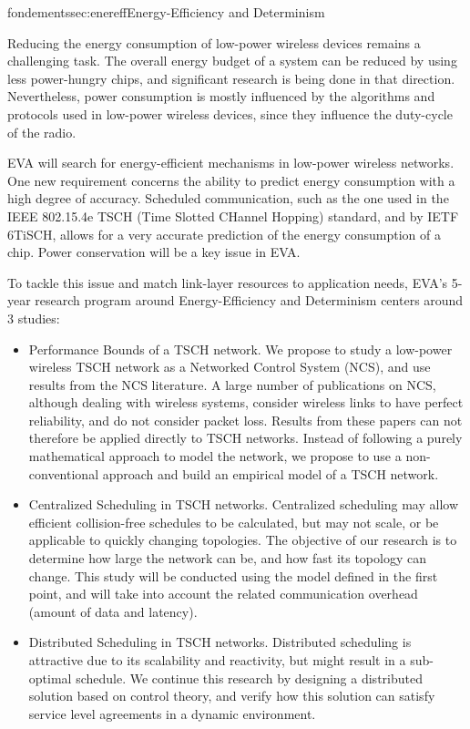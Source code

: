\documentclass{ra2016}
\begin{document}
\begin{module}{fondements}{sec:enereff}{Energy-Efficiency and Determinism}

Reducing the energy consumption of low-power wireless devices remains a challenging task. The overall energy budget of a system can be reduced by using less power-hungry chips, and significant research is being done in that direction. Nevertheless, power consumption is mostly influenced by the algorithms and protocols used in low-power wireless devices, since they influence the duty-cycle of the radio.

EVA will search for energy-efficient mechanisms in low-power wireless networks. One new requirement concerns the ability to predict energy consumption with a high degree of accuracy. Scheduled communication, such as the one used in the IEEE 802.15.4e TSCH (Time Slotted CHannel Hopping) standard, and by IETF 6TiSCH, allows for a very accurate prediction of the energy consumption of a chip. Power conservation will be a key issue in EVA.

To tackle this issue and match link-layer resources to application needs, EVA's 5-year research program around Energy-Efficiency and Determinism centers around 3 studies:

\begin{itemize}
    \item Performance Bounds of a TSCH network. We propose to study a low-power wireless TSCH network as a Networked Control System (NCS), and use results from the NCS literature. A large number of publications on NCS, although dealing with wireless systems, consider wireless links to have perfect reliability, and do not consider packet loss. Results from these papers can not therefore be applied directly to TSCH networks. Instead of following a purely mathematical approach to model the network, we propose to use a non-conventional approach and build an empirical model of a TSCH network.
    \item Centralized Scheduling in TSCH networks. Centralized scheduling may allow efficient collision-free schedules to be calculated, but may not scale, or be applicable to quickly changing topologies. The objective of our research is to determine how large the network can be, and how fast its topology can change. This study will be conducted using the model defined in the first point, and will take into account the related communication overhead  (amount of data and latency).
    \item Distributed Scheduling in TSCH networks. Distributed scheduling is attractive due to its scalability and reactivity, but might result in a sub-optimal schedule. We continue this research by designing a distributed solution based on control theory, and verify how this solution can satisfy service level agreements in a dynamic environment. 
\end{itemize}

\end{module}
\end{document}
